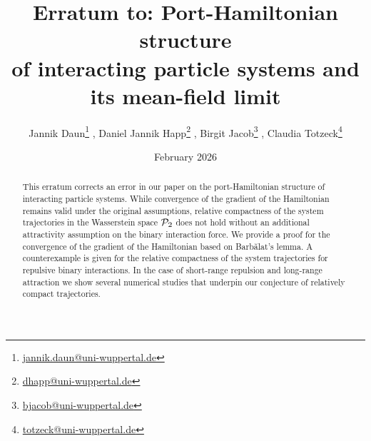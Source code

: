 \documentclass[11pt]{article}
\title{Erratum to: Port-Hamiltonian structure \\of interacting particle systems and its mean-field limit}
\author{Jannik Daun\footnote{\href{mailto:jannik.daun@uni-wuppertal.de}{jannik.daun@uni-wuppertal.de}} , Daniel Jannik Happ\footnote{\href{mailto:dhapp@uni-wuppertal.de}{dhapp@uni-wuppertal.de}} , Birgit Jacob\footnote{ \href{mailto:bjacob@uni-wuppertal.de}{bjacob@uni-wuppertal.de}} ,
Claudia Totzeck\footnote{\href{mailto:totzeck@uni-wuppertal.de}{totzeck@uni-wuppertal.de} }}
\affil{Port-Hamiltonian Institute, School of Mathematics and Natural Sciences, \\ University of Wuppertal, Germany}
\date{February 2026}
\newcommand{\Pp}[1]{
    \ifx #1\infty
        \mathcal{P}_{c}
    \else 
        \mathcal{P}_{#1}
    \fi 
}
\begin{document}
    \maketitle
    \begin{abstract}
This erratum corrects an error in our paper on the port-Hamiltonian structure of interacting particle systems. While convergence of the gradient of the Hamiltonian remains valid under the original assumptions, relative compactness of the system trajectories in the Wasserstein space $\Pp{2}$ does not hold without an additional attractivity assumption on the binary interaction force. We provide a proof for the convergence of the gradient of the Hamiltonian based on {B}arb\u alat's lemma. A counterexample is given for the relative compactness of the system trajectories for repulsive binary interactions. In the case of short-range repulsion and long-range attraction we show several numerical studies that underpin our conjecture of relatively compact trajectories.
\end{abstract}
\end{document}

